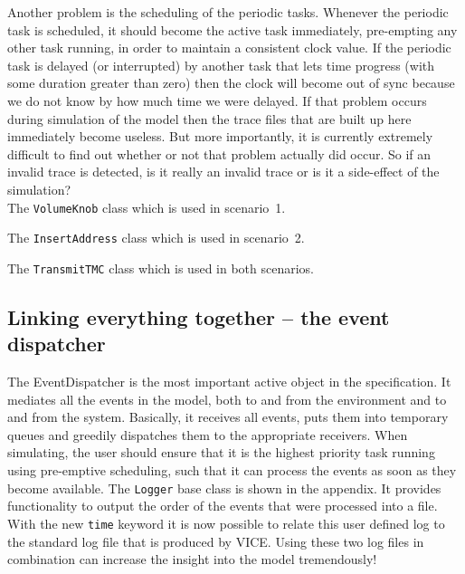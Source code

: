 Another problem is the scheduling of the periodic tasks. Whenever the
periodic task is scheduled, it should become the active task immediately,
pre-empting any other task running, in order to maintain a consistent clock
value. If the periodic task is delayed (or interrupted) by another task that
lets time progress (with some duration greater than zero) then the clock will
become out of sync because we do not know by how much time we were delayed.
If that problem occurs during simulation of the model then the trace files
that are built up here immediately become useless. But more importantly, it
is currently extremely difficult to find out whether or not that problem
actually did occur. So if an invalid trace is detected, is it really an
invalid trace or is it a side-effect of the simulation? \\

\noindent The \verb+VolumeKnob+ class which is used in scenario~1.



\noindent The \verb+InsertAddress+ class which is used in scenario~2.



\noindent The \verb+TransmitTMC+ class which is used in both scenarios.



\subsection{Linking everything together -- the event dispatcher}

The EventDispatcher is the most important active object in the specification.
It mediates all the events in the model, both to and from the environment and
to and from the system. Basically, it receives all events, puts them into
temporary queues and greedily dispatches them to the appropriate receivers.
When simulating, the user should ensure that it is the highest priority task
running using pre-emptive scheduling, such that it can process the events
as soon as they become available. The \verb+Logger+ base class is shown in
the appendix. It provides functionality to output the order of the events
that were processed into a file. With the new \verb+time+ keyword it is
now possible to relate this user defined log to the standard log file that
is produced by VICE. Using these two log files in combination can increase
the insight into the model tremendously!

